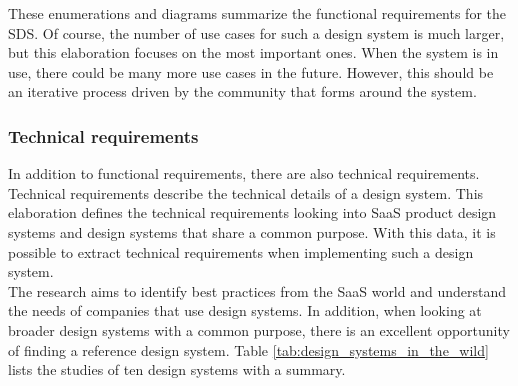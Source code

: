 These enumerations and diagrams summarize the functional requirements for the \ac{SDS}. Of course, the number of use cases for such a design system is much larger, but this elaboration focuses on the most important ones. When the system is in use, there could be many more use cases in the future. However, this should be an iterative process driven by the community that forms around the system. 

\subsubsection{Technical requirements}
In addition to functional requirements, there are also technical requirements. Technical requirements describe the technical details of a design system. This elaboration defines the technical requirements looking into \ac{SaaS} product design systems and design systems that share a common purpose. With this data, it is possible to extract technical requirements when implementing such a design system.\\
The research aims to identify best practices from the \ac{SaaS} world and understand the needs of companies that use design systems. In addition, when looking at broader design systems with a common purpose, there is an excellent opportunity of finding a reference design system. Table \ref{tab:design_systems_in_the_wild} lists the studies of ten design systems with a summary.
